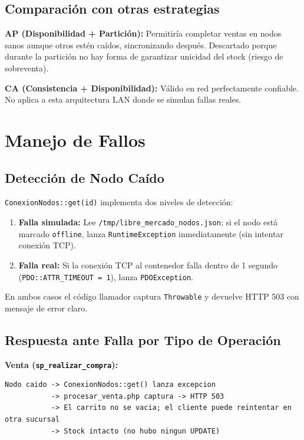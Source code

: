 \documentclass[11pt,a4paper]{article}
\newcommand{\code}[1]{\texttt{#1}}
\begin{document}
\subsection{Comparación con otras estrategias}

\textbf{AP (Disponibilidad + Partición):} Permitiría completar ventas en nodos sanos aunque otros estén caídos, sincronizando después. Descartado porque durante la partición no hay forma de garantizar unicidad del stock (riesgo de sobreventa).

\textbf{CA (Consistencia + Disponibilidad):} Válido en red perfectamente confiable. No aplica a esta arquitectura LAN donde se simulan fallas reales.

\newpage
\section{Manejo de Fallos}

\subsection{Detección de Nodo Caído}

\code{ConexionNodos::get(id)} implementa dos niveles de detección:

\begin{enumerate}[nosep]
    \item \textbf{Falla simulada:} Lee \code{/tmp/libre\_mercado\_nodos.json}; si el nodo está marcado \code{offline}, lanza \code{RuntimeException} inmediatamente (sin intentar conexión TCP).
    \item \textbf{Falla real:} Si la conexión TCP al contenedor falla dentro de 1 segundo (\code{PDO::ATTR\_TIMEOUT = 1}), lanza \code{PDOException}.
\end{enumerate}

En ambos casos el código llamador captura \code{Throwable} y devuelve HTTP 503 con mensaje de error claro.

\subsection{Respuesta ante Falla por Tipo de Operación}

\textbf{Venta (\code{sp\_realizar\_compra}):}
\begin{lstlisting}
Nodo caido -> ConexionNodos::get() lanza excepcion
           -> procesar_venta.php captura -> HTTP 503
           -> El carrito no se vacia; el cliente puede reintentar en otra sucursal
           -> Stock intacto (no hubo ningun UPDATE)
\end{lstlisting}
\end{document}
